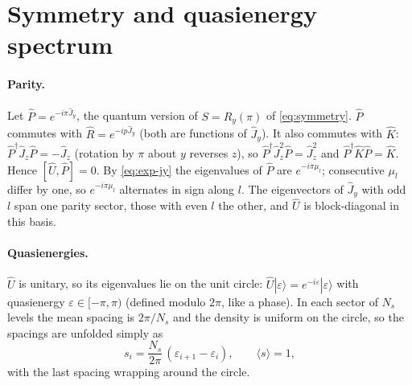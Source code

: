\documentclass[11pt,a4paper]{article}
\begin{document}
\section{Symmetry and quasienergy spectrum}\label{sec:qspectrum}

\paragraph{Parity.} Let $\hat P = e^{-i\pi\hat J_y}$, the quantum version of $S = R_y(\pi)$ of \eqref{eq:symmetry}.
$\hat P$ commutes with $\hat R = e^{-ip\hat J_y}$ (both are functions of $\hat J_y$). It also commutes with $\hat K$: $\hat
P^\dagger\hat J_z\hat P = -\hat J_z$ (rotation by $\pi$ about $y$ reverses $z$), so $\hat P^\dagger\hat J_z^2\hat P = \hat
J_z^2$ and $\hat P^\dagger\hat K\hat P = \hat K$. Hence $[\hat U, \hat P] = 0$. By \eqref{eq:exp-jy} the eigenvalues of
$\hat P$ are $e^{-i\pi\mu_l}$; consecutive $\mu_l$ differ by one, so $e^{-i\pi\mu_l}$ alternates in sign along $l$. The
eigenvectors of $\hat J_y$ with odd $l$ span one parity sector, those with even $l$ the other, and $\hat U$ is
block-diagonal in this basis.

\paragraph{Quasienergies.} $\hat U$ is unitary, so its eigenvalues lie on the unit circle:
$\hat U|\varepsilon\rangle = e^{-i\varepsilon}|\varepsilon\rangle$ with quasienergy $\varepsilon \in [-\pi, \pi)$
(defined modulo $2\pi$, like a phase). In each sector of $N_s$ levels the mean spacing is $2\pi/N_s$ and the density is
uniform on the circle, so the spacings are unfolded simply as
\begin{equation}\label{eq:unfold}
  s_i = \frac{N_s}{2\pi}\,(\varepsilon_{i+1} - \varepsilon_i), \qquad \langle s\rangle = 1 ,
\end{equation}
with the last spacing wrapping around the circle.
\end{document}
